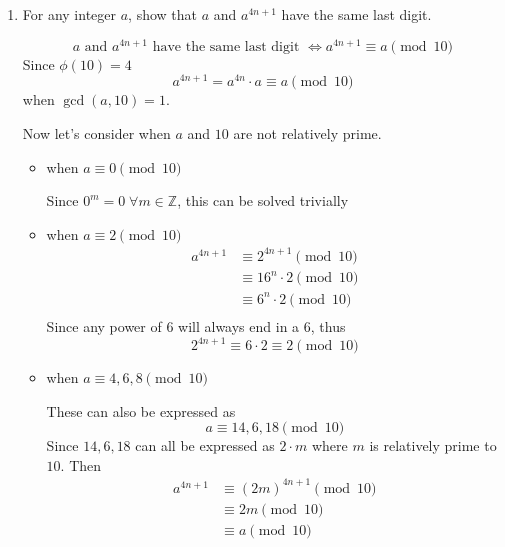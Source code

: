\documentclass[12pt]{exam}
\theoremstyle{definition}
\begin{document}
\begin{enumerate}
      \item For any integer $a$, show that $a$ and $a^{4n+1}$ have the same last digit.

            \begin{answer}
                  \[
                        a \text{ and } a^{4n+1} \text{ have the same last digit } \Leftrightarrow a^{4n+1} \equiv a \pmod{10}
                  \]
                  Since $\phi(10) = 4$
                  \[
                        a^{4n+1} = a^{4n} \cdot a \equiv a \pmod{10}
                  \]
                  when $\gcd(a, 10) = 1$.

                  Now let's consider when $a$ and $10$ are not relatively prime.
                  \begin{itemize}
                        \item when $a \equiv 0 \pmod{10}$

                              Since $0^m = 0 \; \forall m \in \mathbb{Z}$, this can be solved trivially

                        \item when $a \equiv 2 \pmod{10}$
                              \[
                                    \begin{aligned}
                                          a^{4n+1} & \equiv 2^{4n+1} \pmod{10}     \\
                                                   & \equiv 16^n \cdot 2 \pmod{10} \\
                                                   & \equiv 6^n \cdot 2 \pmod{10}  \\
                                    \end{aligned}
                              \]
                              Since any power of $6$ will always end in a $6$, thus
                              \[
                                    2^{4n+1} \equiv 6 \cdot 2 \equiv 2 \pmod{10}
                              \]

                        \item when $a \equiv 4, 6, 8 \pmod{10}$
                        
                        These can also be expressed as
                        \[
                              a \equiv 14, 6, 18 \pmod{10}
                              \]
                              Since $14, 6, 18$ can all be expressed as $2 \cdot m$ where $m$ is relatively prime to $10$.
                              Then 
                              \[
                                    \begin{aligned}
                                          a^{4n+1} & \equiv {(2m)}^{4n+1} \pmod{10} \\
                                          & \equiv 2m \pmod{10} \\
                                          & \equiv a \pmod{10} \\
                                    \end{aligned}
                                    \]
                                    

\end{itemize}
\end{answer}
\end{enumerate}
\end{document}
